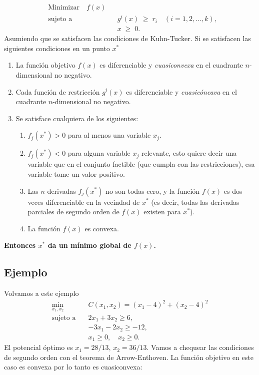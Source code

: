 \documentclass{article}
\begin{document}
\[
\begin{aligned}
&\text{Minimizar} \quad f(x) \\
&\text{sujeto a} \quad && g^{i}(x) \;\ge\; r_{i}
\quad (i = 1,2,\dots,k),\\
& && x \;\ge\; 0.
\end{aligned}
\]
Asumiendo que se satisfacen las condiciones de Kuhn-Tucker.
Si se satisfacen las siguientes condiciones en un punto $x^*$
\begin{enumerate}\color{teal}
  \item La función objetivo \(f(x)\) es diferenciable y \emph{cuasiconvexa} en el cuadrante \(n\)-dimensional no negativo.
  \item Cada función de restricción \(g^{i}(x)\) es diferenciable y \emph{cuasicóncava} en el cuadrante \(n\)-dimensional no negativo.
  \item Se satisface cualquiera de los siguientes:
    \begin{enumerate}
      \item \(f_{j}(x^{*}) > 0\) para al menos una variable \(x_{j}\).
      \item \(f_{j}(x^{*}) < 0\) para alguna variable \(x_{j}\) relevante, esto quiere decir una variable que en el conjunto factible (que cumpla con las restricciones), esa variable tome un valor positivo.
      \item Las \(n\) derivadas \(f_{j}(x^{*})\) no son todas cero, y la función \(f(x)\) es dos veces diferenciable en la vecindad de \(x^{*}\) (es decir, todas las derivadas parciales de segundo orden de \(f(x)\) existen para \(x^{*}\)).
      \item La función \(f(x)\) es convexa.
    \end{enumerate}
\end{enumerate}

\textbf{\color{teal}Entonces \(x^{*}\) da un mínimo global de \(f(x)\).
}



\subsection*{Ejemplo}
Volvamos a este ejemplo
\[
\begin{aligned}
\min_{x_1,x_2}\quad & C(x_1,x_2)=(x_1-4)^2+(x_2-4)^2\\
\text{sujeto a}\quad & 2x_1+3x_2 \ge 6,\\
& -3x_1-2x_2 \ge -12,\\
& x_1\ge 0,\quad x_2\ge 0.
\end{aligned}
\]
El potencial óptimo es $x_1=28/13$, $x_2=36/13$. Vamos a chequear las condiciones de segundo orden con el teorema de Arrow-Enthoven. La función objetivo en este caso es convexa por lo tanto es cuasiconvexa:
\end{document}
